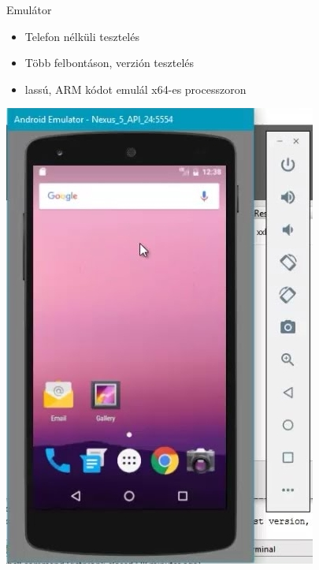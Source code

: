 \documentclass{beamer}
\begin{document}
\begin{frame}[fragile]{Emulátor}
	\begin{minipage}{0.49\textwidth}
		\begin{itemize}
			\item Telefon nélküli tesztelés
			\item Több felbontáson, verzión tesztelés
			\item lassú, ARM kódot emulál x64-es processzoron
		\end{itemize}
	\end{minipage}
	\begin{minipage}{0.49\textwidth}
		\begin{itemize}
			\includegraphics[width=1\linewidth]{figures/avd.jpg}
		\end{itemize}
	\end{minipage}
\end{frame}
\end{document}
